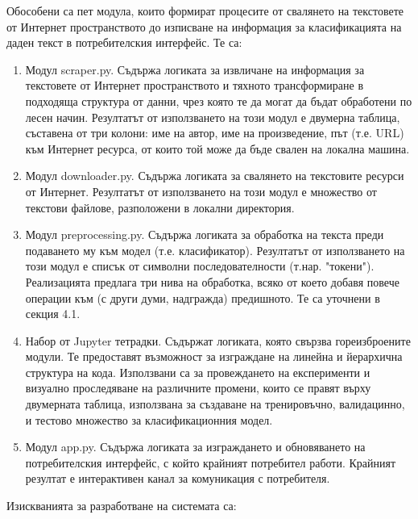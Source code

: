 \documentclass[12pt]{article}
\begin{document}
\vspace{1em}

Обособени са пет модула, които формират процесите от свалянето на текстовете от Интернет пространството до изписване на информация за класификацията на даден текст в потребителския интерфейс. Те са:

\begin{enumerate}
    \item Модул scraper.py. Съдържа логиката за извличане на информация за текстовете от Интернет пространството и тяхното трансформиране в подходяща структура от данни, чрез която те да могат да бъдат обработени по лесен начин. Резултатът от използването на този модул е двумерна таблица, съставена от три колони: име на автор, име на произведение, път (т.е. URL) към Интернет ресурса, от които той може да бъде свален на локална машина.
    \item Модул downloader.py. Съдържа логиката за свалянето на текстовите ресурси от Интернет. Резултатът от използването на този модул е множество от текстови файлове, разположени в локални директория.
    \item Модул preprocessing.py. Съдържа логиката за обработка на текста преди подаването му към модел (т.е. класификатор). Резултатът от използването на този модул е списък от символни последователности (т.нар. "токени"). Реализацията предлага три нива на обработка, всяко от което добавя повече операции към (с други думи, надгражда) предишното. Те са уточнени в секция 4.1.
    \item Набор от Jupyter тетрадки. Съдържат логиката, която свързва гореизброените модули. Те предоставят възможност за изграждане на линейна и йерархична структура на кода. Използвани са за провеждането на експерименти и визуално проследяване на различните промени, които се правят върху двумерната таблица, използвана за създаване на тренировъчно, валидацинно, и тестово множество за класификационния модел.
    \item Модул app.py. Съдържа логиката за изграждането и обновяването на потребителския интерфейс, с който крайният потребител работи. Крайният резултат е интерактивен канал за комуникация с потребителя.
\end{enumerate}

\vspace{1em}
    
Изискванията за разработване на системата са:
\end{document}
